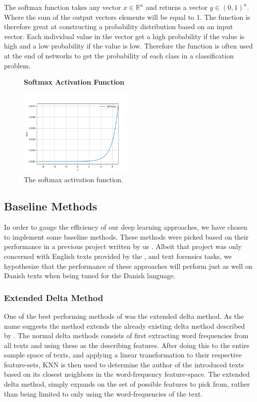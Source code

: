 The softmax function takes any vector $x \in \mathbb{R}^n$ and returns a vector
$y \in (0, 1)^n$. Where the sum of the output vectors elements will be equal to
1. The function is therefore great at constructing a probability distribution
based on an input vector. Each individual value in the vector get a high
probability if the value is high and a low probability if the value is low.
Therefore the function is often used at the end of networks to get the
probability of each class in a classification problem.

\begin{figure}
    \centering
    \textbf{Softmax Activation Function}\par\medskip
    \includegraphics[width=0.5\textwidth]{./pictures/method/softmax_function.png}
    \caption{The softmax activation function.}
    \label{fig:softmax_activation}
\end{figure}


\subsection{Baseline Methods}

In order to gauge the efficiency of our deep learning approaches, we have chosen
to implement some baseline methods. These methods were picked based on their
performance in a previous project written by us \cite{US}. Albeit that project
was only concerned with English texts provided by the \cite{pan:2015}, and
\cite{pan:2014} text forensics tasks, we hypothesize that the performance of
these approaches will perform just as well on Danish texts when being tuned for
the Danish language.


\subsubsection{Extended Delta Method}

One of the best performing methods of \cite{US} was the extended delta method.
As the name suggests the method extends the already existing delta method
described by \cite{evert2015towards}. The normal delta methods consists of first
extracting word frequencies from all texts and using these as the describing
features. After doing this to the entire sample space of texts, and applying a
linear transformation to their respective feature-sets, \gls{KNN} is then used
to determine the author of the introduced texts based on its closest neighbors
in the word-frequency feature-space. The extended delta method, simply expands
on the set of possible features to pick from, rather than being limited to only
using the word-frequencies of the text.


